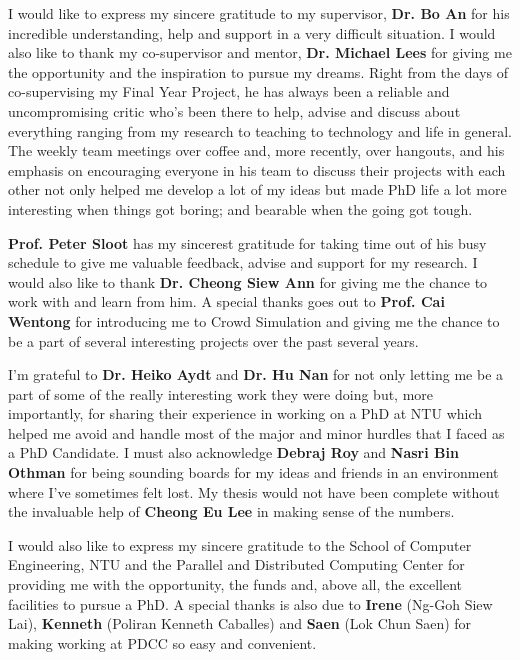 
\begin{acknowledgements}

I would like to express my sincere gratitude to my supervisor, \textbf{Dr. Bo An} for his incredible understanding, help and support in a very difficult situation. I would also like to thank my co-supervisor and mentor, \textbf{Dr. Michael Lees} for giving me the opportunity and the inspiration to pursue my dreams. Right from the days of co-supervising my Final Year Project, he has always been a reliable and uncompromising critic who's been there to help, advise and discuss about everything ranging from my research to teaching to technology and life in general. The weekly team meetings over coffee and, more recently, over hangouts, and his emphasis on encouraging everyone in his team to discuss their projects with each other not only helped me develop a lot of my ideas but made PhD life a lot more interesting when things got boring; and bearable when the going got tough.

\textbf{Prof. Peter Sloot} has my sincerest gratitude for taking time out of his busy schedule to give me valuable feedback, advise and support for my research. I would also like to thank \textbf{Dr. Cheong Siew Ann} for giving me the chance to work with and learn from him. A special thanks goes out to \textbf{Prof. Cai Wentong} for introducing me to Crowd Simulation and giving me the chance to be a part of several interesting projects over the past several years.

I'm grateful to \textbf{Dr. Heiko Aydt} and \textbf{Dr. Hu Nan} for not only letting me be a part of some of the really interesting work they were doing but, more importantly, for sharing their experience in working on a PhD at NTU which helped me avoid and handle most of the major and minor hurdles that I faced as a PhD Candidate. I must also acknowledge \textbf{Debraj Roy} and \textbf{Nasri Bin Othman} for being sounding boards for my ideas and friends in an environment where I've sometimes felt lost. My thesis would not have been complete without the invaluable help of \textbf{Cheong Eu Lee} in making sense of the numbers.

I would also like to express my sincere gratitude to the School of Computer Engineering, NTU and the Parallel and Distributed Computing Center for providing me with the opportunity, the funds and, above all, the excellent facilities to pursue a PhD. A special thanks is also due to \textbf{Irene} (Ng-Goh Siew Lai), \textbf{Kenneth} (Poliran Kenneth Caballes) and \textbf{Saen} (Lok Chun Saen) for making working at PDCC so easy and convenient.


\end{acknowledgements}
